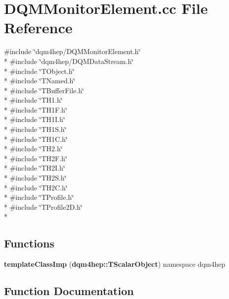 \section{D\+Q\+M\+Monitor\+Element.\+cc File Reference}
\label{DQMMonitorElement_8cc}
{\ttfamily \#include \char`\"{}dqm4hep/\+D\+Q\+M\+Monitor\+Element.\+h\char`\"{}}\\*
{\ttfamily \#include \char`\"{}dqm4hep/\+D\+Q\+M\+Data\+Stream.\+h\char`\"{}}\\*
{\ttfamily \#include \char`\"{}T\+Object.\+h\char`\"{}}\\*
{\ttfamily \#include \char`\"{}T\+Named.\+h\char`\"{}}\\*
{\ttfamily \#include \char`\"{}T\+Buffer\+File.\+h\char`\"{}}\\*
{\ttfamily \#include \char`\"{}T\+H1.\+h\char`\"{}}\\*
{\ttfamily \#include \char`\"{}T\+H1\+F.\+h\char`\"{}}\\*
{\ttfamily \#include \char`\"{}T\+H1\+I.\+h\char`\"{}}\\*
{\ttfamily \#include \char`\"{}T\+H1\+S.\+h\char`\"{}}\\*
{\ttfamily \#include \char`\"{}T\+H1\+C.\+h\char`\"{}}\\*
{\ttfamily \#include \char`\"{}T\+H2.\+h\char`\"{}}\\*
{\ttfamily \#include \char`\"{}T\+H2\+F.\+h\char`\"{}}\\*
{\ttfamily \#include \char`\"{}T\+H2\+I.\+h\char`\"{}}\\*
{\ttfamily \#include \char`\"{}T\+H2\+S.\+h\char`\"{}}\\*
{\ttfamily \#include \char`\"{}T\+H2\+C.\+h\char`\"{}}\\*
{\ttfamily \#include \char`\"{}T\+Profile.\+h\char`\"{}}\\*
{\ttfamily \#include \char`\"{}T\+Profile2\+D.\+h\char`\"{}}\\*
\subsection*{Functions}
\begin{DoxyCompactItemize}
\item 
{\bf template\+Class\+Imp} ({\bf dqm4hep\+::\+T\+Scalar\+Object}) namespace dqm4hep
\end{DoxyCompactItemize}


\subsection{Function Documentation}
